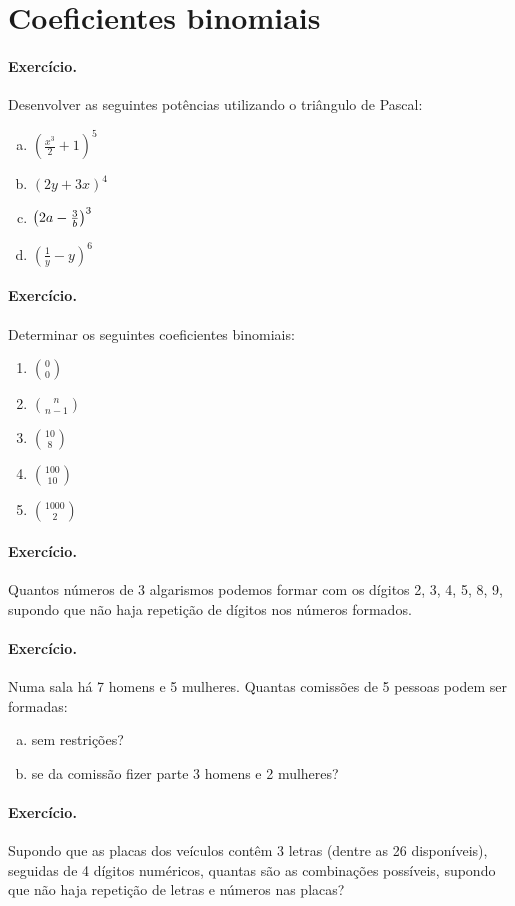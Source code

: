 \def\exercise{\paragraph{Exercício. }}
\def\correta{}

\section*{Coeficientes binomiais}


\exercise{} Desenvolver as seguintes pot\^encias utilizando o
tri\^angulo de Pascal:

\begin{enumerate}[(a)]
\item $\left( \frac{x^3}{2} + 1\right)^5$
\item $\left( 2y + 3x\right)^4$
\item $\left( 2a - {3 \over b}\right)^3$
\item $\left( \frac{1}{y} - y \right)^6 $
\end{enumerate}

\exercise{} Determinar os seguintes coeficientes binomiais:

\begin{enumerate}
\item $0 \choose 0$
\item $ n \choose n-1 $
\item $ 10 \choose 8$
\item $ 100 \choose 10$
\item $ 1000 \choose 2$
\end{enumerate}


\exercise{} Quantos números de 3 algarismos podemos formar com os
dígitos 2, 3, 4, 5, 8, 9, supondo que não haja repetição de dígitos
nos números formados.

\exercise{} Numa sala há 7 homens e 5 mulheres. Quantas comissões de 5
pessoas podem ser formadas:

\begin{enumerate}[(a)]
\item sem restrições?
\item se da comissão fizer parte 3 homens e 2 mulheres?
\end{enumerate}

\exercise{} Supondo que as placas dos veículos contêm 3 letras (dentre
as 26 disponíveis), seguidas de 4 dígitos numéricos, quantas são as
combinações possíveis, supondo que não haja repetição de letras e
números nas placas?


